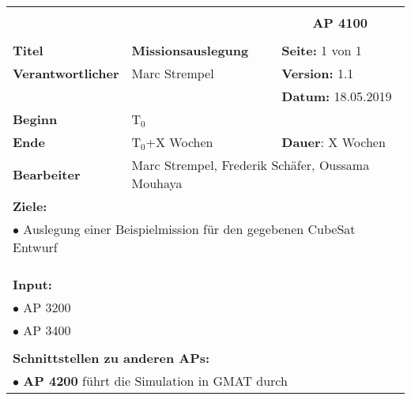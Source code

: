 \clearpage
\begin{table}[!h]
 \begin{center}
  \begin{tabular}{|p{35mm}||p{55mm}|p{50mm}||p{40mm}|}
   \hline
   \multicolumn{3}{|l||}{\textbf{}} & \multicolumn{1}{c|}{}\\
   \multicolumn{3}{|l||}{\textbf{}} & \multicolumn{1}{c|}{\textbf{AP 4100}}\\
   \multicolumn{3}{|l||}{\textbf{}} & \multicolumn{1}{c|}{}\\
   \hline\hline
   \textbf{Titel} & \multicolumn{2}{p{7cm}||}{\textbf{Missionsauslegung}} & \textbf{Seite:} 1 von 1\\
   \hline
   \textbf{Verantwortlicher} & \multicolumn{2}{l||}{Marc Strempel} & \textbf{Version:} 1.1\\
   \hline
   \multicolumn{3}{|l||}{} & \textbf{Datum:} 18.05.2019\\
   \hline\hline
   \textbf{Beginn} & \multicolumn{2}{l||}{T$_0$} & \\
   \hline
   \textbf{Ende} & \multicolumn{2}{l||}{T$_0$+X Wochen} & \textbf{Dauer}: X Wochen\\
   \hline\hline
   \textbf{Bearbeiter} & \multicolumn{3}{l|}{Marc Strempel, Frederik Schäfer, Oussama Mouhaya}\\
   \hline\hline
   \multicolumn{4}{|p{150mm}|}{\textbf{Ziele:}}\\
   \multicolumn{4}{|p{150mm}|}{$\bullet$ Auslegung einer Beispielmission für den gegebenen CubeSat Entwurf}\\
   \multicolumn{4}{|p{150mm}|}{}\\
   \multicolumn{4}{|p{150mm}|}{}\\
   \multicolumn{4}{|p{150mm}|}{}\\
   \multicolumn{4}{|p{150mm}|}{\textbf{Input:}}\\
   \multicolumn{4}{|p{150mm}|}{$\bullet$ AP 3200}\\
   \multicolumn{4}{|p{150mm}|}{$\bullet$ AP 3400}\\
   \multicolumn{4}{|p{150mm}|}{}\\
   \multicolumn{4}{|p{150mm}|}{\textbf{Schnittstellen zu anderen APs:}}\\
   \multicolumn{4}{|p{150mm}|}{$\bullet$ \textbf{AP 4200} führt die Simulation in GMAT durch}\\

\end{tabular}
\end{center}
\end{table}
